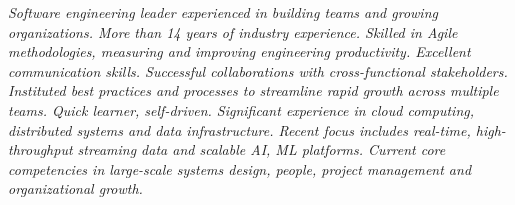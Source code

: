 {\selectfont
	\begin{justify}\textit{Software engineering leader experienced in building teams and growing organizations. More than 14 years of industry experience. Skilled in Agile methodologies, measuring and improving engineering productivity. Excellent communication skills. Successful collaborations with cross-functional stakeholders. Instituted best practices and processes to streamline rapid growth across multiple teams. Quick learner, self-driven. Significant experience in cloud computing, distributed systems and data infrastructure. Recent focus includes real-time, high-throughput streaming data and scalable AI, ML platforms. Current core competencies in large-scale systems design, people, project management and organizational growth.}\end{justify}
}
\vspace{-12pt}